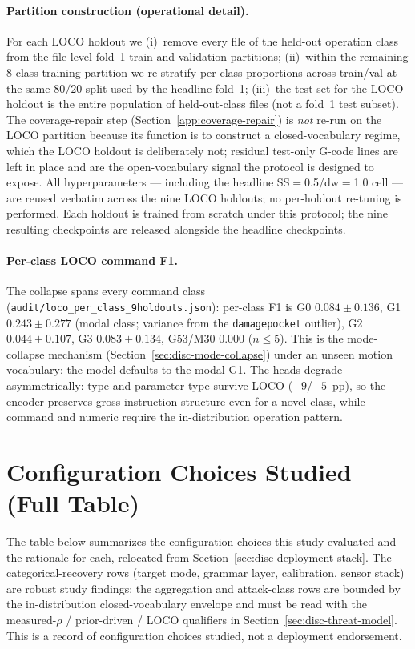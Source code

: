 \documentclass[11pt,a4paper]{article}
\begin{document}
\paragraph{Partition construction (operational detail).} For each LOCO holdout we (i)~remove every file of the held-out operation class from the file-level fold~1 train and validation partitions; (ii)~within the remaining $8$-class training partition we re-stratify per-class proportions across train/val at the same $80/20$ split used by the headline fold~1; (iii)~the test set for the LOCO holdout is the entire population of held-out-class files (not a fold~1 test subset). The coverage-repair step (Section~\ref{app:coverage-repair}) is \emph{not} re-run on the LOCO partition because its function is to construct a closed-vocabulary regime, which the LOCO holdout is deliberately not; residual test-only G-code lines are left in place and are the open-vocabulary signal the protocol is designed to expose. All hyperparameters --- including the headline SS$=$0.5/dw$=$1.0 cell --- are reused verbatim across the nine LOCO holdouts; no per-holdout re-tuning is performed. Each holdout is trained from scratch under this protocol; the nine resulting checkpoints are released alongside the headline checkpoints.

\paragraph{Per-class LOCO command F1.} The collapse spans every command class (\texttt{audit/loco\_per\_class\_9holdouts.json}): per-class F1 is G0 $0.084 \pm 0.136$, G1 $0.243 \pm 0.277$ (modal class; variance from the \texttt{damagepocket} outlier), G2 $0.044 \pm 0.107$, G3 $0.083 \pm 0.134$, G53/M30 $0.000$ ($n\le5$). This is the mode-collapse mechanism (Section~\ref{sec:disc-mode-collapse}) under an unseen motion vocabulary: the model defaults to the modal G1. The heads degrade asymmetrically: type and parameter-type survive LOCO ($-9$/$-5$~pp), so the encoder preserves gross instruction structure even for a novel class, while command and numeric require the in-distribution operation pattern.

\section{Configuration Choices Studied (Full Table)}
\label{app:config-table}

The table below summarizes the configuration choices this study evaluated and
the rationale for each, relocated from Section~\ref{sec:disc-deployment-stack}.
The categorical-recovery rows (target mode, grammar layer, calibration, sensor
stack) are robust study findings; the aggregation and attack-class rows are
bounded by the in-distribution closed-vocabulary envelope and must be read with
the measured-$\rho$ / prior-driven / LOCO qualifiers in
Section~\ref{sec:disc-threat-model}. This is a record of configuration choices
studied, not a deployment endorsement.
\end{document}
